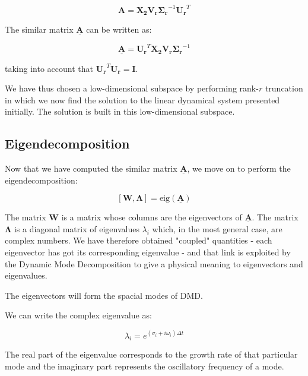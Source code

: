 \documentclass[10pt,twocolumn]{article}
\begin{document}
\begin{equation} \label{eq:A}
\mathbf{A} = \mathbf{X_2} \mathbf{V_r} \mathbf{\Sigma_r}^{-1} \mathbf{U_r}^T
\end{equation}

The similar matrix $\underline{\mathbf{A}}$ can be written as:

\begin{equation} \label{eq:A_underline}
\underline{\mathbf{A}} = \mathbf{U_r}^T \mathbf{X_2} \mathbf{V_r} \mathbf{\Sigma_r}^{-1} 
\end{equation}

taking into account that $\mathbf{U_r}^T \mathbf{U_r} = \mathbf{I}$.

We have thus chosen a low-dimensional subspace by performing rank-$r$ truncation in which we now find the solution to the linear dynamical system presented initially. The solution is built in this low-dimensional subspace.

\subsection{Eigendecomposition}

Now that we have computed the similar matrix $\underline{\mathbf{A}}$, we move on to perform the eigendecomposition:

\begin{equation} \label{eq:A_underline}
[\mathbf{W}, \mathbf{\Lambda}] = \text{eig}(\underline{\mathbf{A}})
\end{equation}

The matrix $\mathbf{W}$ is a matrix whose columns are the eigenvectors of $\underline{\mathbf{A}}$. The matrix $\mathbf{\Lambda}$ is a diagonal matrix of eigenvalues $\lambda_i$ which, in the most general case, are complex numbers. We have therefore obtained "coupled" quantities - each eigenvector has got its corresponding eigenvalue - and that link is exploited by the Dynamic Mode Decomposition to give a physical meaning to eigenvectors and eigenvalues.

The eigenvectors will form the spacial modes of DMD. 

We can write the complex eigenvalue as:

\begin{equation} \label{eq:A_underline}
\lambda_i = e^{(\sigma_i + i \omega_i) \Delta t} 
\end{equation}

The real part of the eigenvalue corresponds to the growth rate of that particular mode and the imaginary part represents the oscillatory frequency of a mode.
\end{document}
